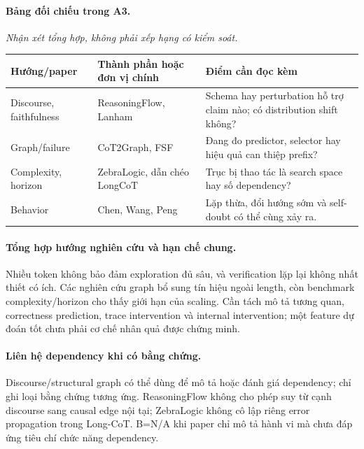 \begin{samepage}
\paragraph{Bảng đối chiếu trong A3.}
\noindent\textit{Nhận xét tổng hợp, không phải xếp hạng có kiểm soát.}
\begin{center}\small
\begin{tabularx}{\textwidth}{>{\raggedright\arraybackslash}p{2.7cm}>{\raggedright\arraybackslash}X>{\raggedright\arraybackslash}X}
\toprule
\textbf{Hướng/paper} & \textbf{Thành phần hoặc đơn vị chính} & \textbf{Điểm cần đọc kèm} \\
\midrule
Discourse, faithfulness & ReasoningFlow, Lanham & Schema hay perturbation hỗ trợ claim nào; có distribution shift không? \\
Graph/failure & CoT2Graph, FSF & Đang đo predictor, selector hay hiệu quả can thiệp prefix? \\
Complexity, horizon & ZebraLogic, dẫn chéo LongCoT & Trục bị thao tác là search space hay số dependency? \\
Behavior & Chen, Wang, Peng & Lặp thừa, đổi hướng sớm và self-doubt có thể cùng xảy ra. \\
\bottomrule
\end{tabularx}
\end{center}
\end{samepage}
\paragraph{Tổng hợp hướng nghiên cứu và hạn chế chung.}
Nhiều token không bảo đảm exploration đủ sâu, và verification lặp lại không nhất thiết có ích. Các nghiên cứu graph bổ sung tín hiệu ngoài length, còn benchmark complexity/horizon cho thấy giới hạn của scaling. Cần tách mô tả tương quan, correctness prediction, trace intervention và internal intervention; một feature dự đoán tốt chưa phải cơ chế nhân quả được chứng minh.

\paragraph{Liên hệ dependency khi có bằng chứng.}
Discourse/structural graph có thể dùng để mô tả hoặc đánh giá dependency; chỉ ghi loại bằng chứng tương ứng. ReasoningFlow không cho phép suy từ cạnh discourse sang causal edge nội tại; ZebraLogic không cô lập riêng error propagation trong Long-CoT. B=N/A khi paper chỉ mô tả hành vi mà chưa đáp ứng tiêu chí chức năng dependency.

